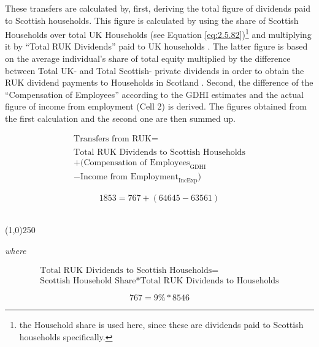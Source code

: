 \begin{enumerate}
These transfers are calculated by, first, deriving the total figure of dividends paid to Scottish households. This figure is calculated by using the share of Scottish Households over total UK Households (see Equation \ref{eq:2.5.82})\footnote{the Household share is used here, since these are dividends paid to Scottish households specifically.} and multiplying it by ``Total RUK Dividends'' paid to UK households \cite{ONS2011c}. The latter figure is based on the average individual's share of total equity multiplied by the difference between Total UK- and Total Scottish- private dividends in order to obtain the RUK dividend payments to Households in Scotland \cite{ONS2011a,ONS2011b}.
Second, the difference of the ``Compensation of Employees'' according to the GDHI estimates and the actual figure of income from employment (Cell 2) is derived. The figures obtained from the first calculation and the second one are then summed up.


\begin{equation}
\begin{split}
\text{Transfers from RUK} =  \\ \\
\text{Total RUK Dividends to Scottish Households}\\
+(\text{Compensation of Employees}_\text{GDHI}\\
-\text{Income from Employment}_\text{IncExp})
\end{split} \label{eq:2.5.9}
\end{equation}

\begin{equation} \nonumber
1853= 767+(64645-63561)
\end{equation}\\

\begin{center}
\line(1,0){250}
\end{center}

\textit{where}

\begin{equation}
\begin{split}
\text{Total RUK Dividends to Scottish Households}=\\
\text{Scottish Household Share}*\text{Total RUK Dividends to Households}
\end{split} \label{eq:2.5.10}
\end{equation}

\begin{equation}\nonumber
767=9\%*8546
\end{equation}


\end{enumerate}
